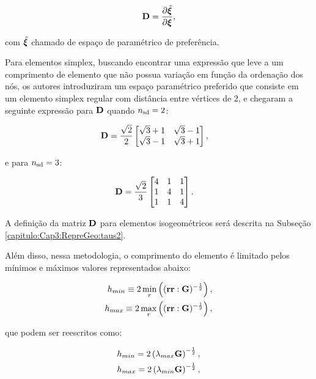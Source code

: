 \documentclass[tese_patricia]{subfiles}%
\begin{document}
\begin{align}
	\mathbf{D} = \frac{\partial{\hat{\bm{\xi}}}}{\partial{\bm{\xi}}},
\end{align}

\noindent com $\hat{\bm{\xi}}$ chamado de espaço de paramétrico de preferência.

Para elementos simplex, buscando encontrar uma expressão que leve a um comprimento de elemento que não possua variação em função da ordenação dos nós, os autores introduziram um espaço paramétrico preferido que consiste em um elemento simplex regular com distância entre vértices de 2, e chegaram a seguinte expressão para $\mathbf{D}$ quando ${n_{\mathrm{sd}}} = 2$:

\begin{align}
	\mathbf{D}&= \frac{\sqrt{2}}{2} \begin{bmatrix}
		\sqrt{3} + 1 & \sqrt{3} - 1 \\
		\sqrt{3} - 1 & \sqrt{3} + 1
	\end{bmatrix},
\end{align}

\noindent e para ${n_{\mathrm{sd}}} = 3$:

\begin{align}
	\mathbf{D}&= \frac{\sqrt{2}}{3} \begin{bmatrix}
		4 & 1 & 1 \\
		1 & 4 & 1 \\
		1 & 1 & 4
	\end{bmatrix}.
\end{align}


A definição da matriz $\mathbf{D}$ para elementos isogeométricos será descrita na Subseção \ref{capitulo:Cap3:RepreGeo:taus2}.

Além disso, nessa metodologia, o comprimento do elemento é limitado pelos mínimos e máximos valores representados abaixo:

\begin{align}
	h_{min} \equiv 2\min_{r}\left((\mathbf{r}\mathbf{r}:\mathbf{G})^{-\frac{1}{2}} \right), \\
	h_{max} \equiv 2\max_{r}\left((\mathbf{r}\mathbf{r}:\mathbf{G})^{-\frac{1}{2}} \right),
\end{align}

\noindent que podem ser reescritos como:

\begin{align}
	h_{min} = 2\left(\lambda_{max}\mathbf{G}\right)^{-\frac{1}{2}}, \\
	h_{max} = 2\left(\lambda_{min}\mathbf{G}\right)^{-\frac{1}{2}},
\end{align}
\end{document}
